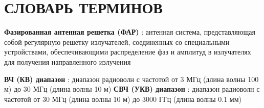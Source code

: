 \chapter*{СЛОВАРЬ ТЕРМИНОВ}             %

\textbf{Фазированная антенная решетка (ФАР)} : антенная система, представляющая собой регулярную решетку излучателей, соединенных со специальными устройствами, обеспечивающими распределение фаз и амплитуд в излучателях для получения направленного излучения

\textbf{ВЧ (КВ) диапазон} : диапазон радиоволн с частотой от 3 МГц (длина волны 100 м) до 30 МГц (длина волны 10 м)
\textbf{СВЧ (УКВ) диапазон} : диапазон радиоволн с частотой от 30 МГц (длина волны 10 м) до 3000 ГГц (длина волны 0.1 мм)
